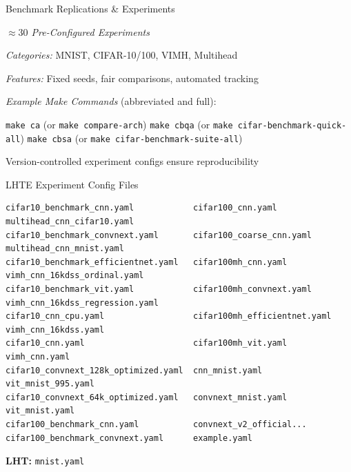 \begin{slide}[\slideopts,toc={Benchmarks}]{Benchmark Replications \& Experiments}
  
  \emph{$\approx 30$ Pre-Configured Experiments}
  
  \begin{itemize}
    \mpitem \emph{Categories:} MNIST, CIFAR-10/100, VIMH, Multihead
    
    \mpitem \emph{Features:} Fixed seeds, fair comparisons, automated tracking
    
    \mpitem \emph{Example Make Commands} (abbreviated and full):
    \begin{itemize}
      \mpitem \texttt{make ca} \quad \quad (or \texttt{make compare-arch})
      \mpitem \texttt{make cbqa} \quad (or \texttt{make cifar-benchmark-quick-all})
      \mpitem \texttt{make cbsa} \quad (or \texttt{make cifar-benchmark-suite-all})
    \end{itemize}
    \mpitem Version-controlled experiment configs ensure reproducibility
  \end{itemize}
\end{slide}

\begin{wideslide}[\slideopts,toc={Experiments},method=direct]{LHTE Experiment Config Files}
{\footnotesize
\begin{verbatim}
cifar10_benchmark_cnn.yaml            cifar100_cnn.yaml             multihead_cnn_cifar10.yaml
cifar10_benchmark_convnext.yaml       cifar100_coarse_cnn.yaml      multihead_cnn_mnist.yaml
cifar10_benchmark_efficientnet.yaml   cifar100mh_cnn.yaml           vimh_cnn_16kdss_ordinal.yaml
cifar10_benchmark_vit.yaml            cifar100mh_convnext.yaml      vimh_cnn_16kdss_regression.yaml
cifar10_cnn_cpu.yaml                  cifar100mh_efficientnet.yaml  vimh_cnn_16kdss.yaml
cifar10_cnn.yaml                      cifar100mh_vit.yaml           vimh_cnn.yaml
cifar10_convnext_128k_optimized.yaml  cnn_mnist.yaml                vit_mnist_995.yaml
cifar10_convnext_64k_optimized.yaml   convnext_mnist.yaml           vit_mnist.yaml
cifar100_benchmark_cnn.yaml           convnext_v2_official...
cifar100_benchmark_convnext.yaml      example.yaml                  
\end{verbatim}
}
\textbf{LHT:} \; \texttt{mnist.yaml}
\end{wideslide}


